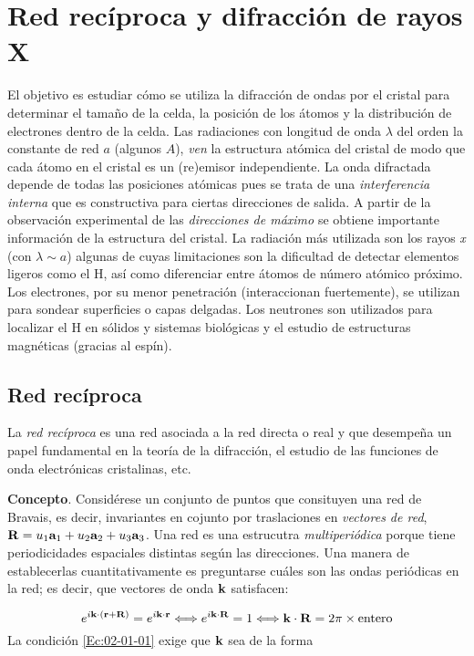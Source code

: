 \chapter{Red recíproca y difracción de rayos X} \label{Ch:02}

El objetivo es estudiar cómo se utiliza la difracción de ondas por el cristal para determinar el tamaño de la celda, la posición de los átomos y la distribución de electrones dentro de la celda. Las radiaciones con longitud de onda $\lambda$ del orden la constante de red $a$   (algunos $ A$), {\it ven} la estructura atómica del cristal de modo que cada átomo en el cristal es un (re)emisor independiente. La onda difractada depende de todas las posiciones atómicas pues se trata de una \textit{interferencia interna} que es constructiva para ciertas direcciones de salida. A partir de la observación experimental de las \textit{direcciones de máximo} se obtiene importante información de la estructura del cristal. La radiación más utilizada son los rayos {\it x} (con $\lambda \sim a$) algunas de cuyas limitaciones son la dificultad de detectar elementos ligeros como el H, así como diferenciar entre átomos de número atómico próximo. Los electrones, por su menor penetración (interaccionan fuertemente), se utilizan para sondear superficies o capas delgadas. Los neutrones son utilizados para localizar el H en sólidos y sistemas biológicas y el estudio de estructuras magnéticas (gracias al espín).

\section{Red recíproca}

La \textit{red recíproca} es una red asociada a la red directa o real y que desempeña un papel fundamental en la teoría de la difracción, el estudio de las funciones de onda electrónicas cristalinas, etc. 

\textbf{Concepto}. Considérese un conjunto de puntos que consituyen una red de Bravais, es decir, invariantes en cojunto por traslaciones en \textit{vectores de red}, $\mathbf{R} = u_1 \mathbf{a}_1 + u_2 \mathbf{a}_2 + u_3 \mathbf{a}_3$. Una red es una estrucutra \textit{multiperiódica} porque tiene periodicidades espaciales distintas según las direcciones. Una manera de establecerlas cuantitativamente es preguntarse cuáles son las ondas periódicas en la red; es decir, que vectores de onda $\mathbf{k}$ satisfacen:

\begin{equation}
    e^{i\mathbf{k} \cdot (\mathbf{r} + \mathbf{R})} = e^{i \mathbf{k} \cdot \mathbf{r}} \Longleftrightarrow  e^{i \mathbf{k} \cdot \mathbf{R}} = 1 \Longleftrightarrow \mathbf{k} \cdot \mathbf{R} = 2\pi \times \text{entero} \label{Ec:02-01-01}
\end{equation}
La condición \ref{Ec:02-01-01} exige que $\mathbf{k}$ sea de la forma 

